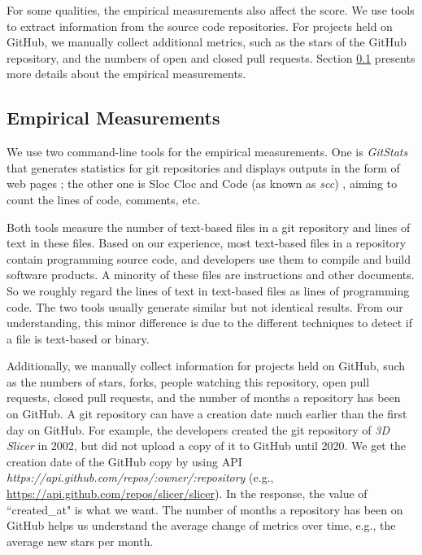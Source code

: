 For some qualities, the empirical measurements also affect the score. We use tools to extract information from the source code repositories. For projects held on GitHub, we manually collect additional metrics, such as the stars of the GitHub repository, and the numbers of open and closed pull requests. Section \ref{sec_empirical_measurements} presents more details about the empirical measurements.

\subsection{Empirical Measurements}
\label{sec_empirical_measurements}

We use two command-line tools for the empirical measurements. One is \textit{GitStats} that generates statistics for git repositories and displays outputs in the form of web pages \cite{Gieniusz2019}; the other one is Sloc Cloc and Code (as known as \textit{scc}) \cite{Boyter2021}, aiming to count the lines of code, comments, etc.

Both tools measure the number of text-based files in a git repository and lines of text in these files. Based on our experience, most text-based files in a repository contain programming source code, and developers use them to compile and build software products. A minority of these files are instructions and other documents. So we roughly regard the lines of text in text-based files as lines of programming code. The two tools usually generate similar but not identical results. From our understanding, this minor difference is due to the different techniques to detect if a file is text-based or binary.

Additionally, we manually collect information for projects held on GitHub, such as the numbers of stars, forks, people watching this repository, open pull requests, closed pull requests, and the number of months a repository has been on GitHub. A git repository can have a creation date much earlier than the first day on GitHub. For example, the developers created the git repository of \textit{3D Slicer} in 2002, but did not upload a copy of it to GitHub until 2020. We get the creation date of the GitHub copy by using API \textit{https://api.github.com/repos/{:owner}/{:repository}} (e.g., \hyperlink{https://api.github.com/repos/slicer/slicer}{https://api.github.com/repos/slicer/slicer}). In the response, the value of ``created\_at" is what we want. The number of months a repository has been on GitHub helps us understand the average change of metrics over time, e.g., the average new stars per month. 


